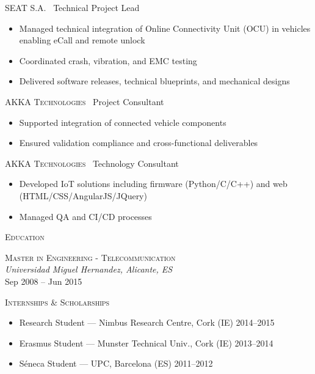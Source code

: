 \documentclass[11pt, a4paper]{article}
\newcommand{\headright}[1]{\vspace*{2ex}\textsc{\large\color{cvblue}#1}\par%
  \vspace*{-1.4ex}{\color{cvblue}\hrulefill}\par}
\newlength{\SideBarW}
\newlength{\BetweenJobsGap}     %
\newenvironment{job}[3]{%
  \vspace{\BetweenJobsGap}%
  \noindent\textsc{#1} \textemdash\ #2\hfill
  \begin{itemize}[leftmargin=1.4em,label=--,labelsep=0.5em,itemsep=0.45ex,topsep=0.2ex]
}{%
  \end{itemize}%
}
\begin{document}
\begin{minipage}{\textwidth}
\begin{minipage}[t]{\dimexpr\textwidth-\SideBarW-3mm\relax}
  \begin{job}{SEAT S.A.}{Technical Project Lead}{Mar 2019 -- Nov 2020}
    \item Managed technical integration of Online Connectivity Unit (OCU) in vehicles enabling eCall and remote unlock
    \item Coordinated crash, vibration, and EMC testing
    \item Delivered software releases, technical blueprints, and mechanical designs
  \end{job}

  \begin{job}{AKKA Technologies}{Project Consultant}{Dec 2017 -- Mar 2019}
    \item Supported integration of connected vehicle components
    \item Ensured validation compliance and cross-functional deliverables
  \end{job}

  \begin{job}{AKKA Technologies}{Technology Consultant}{Oct 2015 -- Dec 2017}
    \item Developed IoT solutions including firmware (Python/C/C++) and web (HTML/CSS/AngularJS/JQuery)
    \item Managed QA and CI/CD processes
  \end{job}

  \headright{Education}
  \noindent\textsc{Master in Engineering - Telecommunication} \\
  \textit{Universidad Miguel Hernandez, Alicante, ES} \\
  Sep 2008 -- Jun 2015

  \headright{Internships \& Scholarships}
  \begin{itemize}[leftmargin=1.2em,label=--,labelsep=0.5em,itemsep=0.4ex,topsep=0.2ex]
    \item Research Student --- Nimbus Research Centre, Cork (IE) \hfill 2014--2015
    \item Erasmus Student --- Munster Technical Univ., Cork (IE) \hfill 2013--2014
    \item Séneca Student --- UPC, Barcelona (ES) \hfill 2011--2012
  \end{itemize}
\end{minipage}
\end{minipage}
\end{document}
